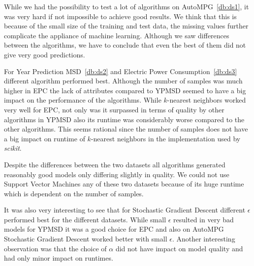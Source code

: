 While we had the possibility to test a lot of algorithms on AutoMPG~\ref{db:ds1}, it was very hard if not impossible to achieve good results. We think that this is because of the small size of the training and test data, the missing values further complicate the appliance of machine learning. Although we saw differences between the algorithms, we have to conclude that even the best of them did not give very good predictions.\par
For Year Prediction MSD~\ref{db:ds2} and Electric Power Consumption~\ref{db:ds3} different algorithm performed best. Although the number of samples was much higher in EPC the lack of attributes compared to YPMSD seemed to have a big impact on the performance of the algorithms. While $k$-nearest neighbors worked very well for EPC, not only was it surpassed in terms of quality by other algorithms in YPMSD also its runtime was considerably worse compared to the other algorithms. This seems rational since the number of samples does not have a big impact on runtime of $k$-nearest neighbors in the implementation used by \textit{scikit}.\par
Despite the differences between the two datasets all algorithms generated reasonably good models only differing slightly in quality. We could not use Support Vector Machines any of these two datasets because of its huge runtime which is dependent on the number of samples.\par

It was also very interesting to see that for Stochastic Gradient Descent different $\epsilon$ performed best for the different datasets. While small $\epsilon$ resulted in very bad models for YPMSD it was a good choice for EPC and also on AutoMPG Stochastic Gradient Descent worked better with small $\epsilon$. Another interesting observation was that the choice of $\alpha$ did not have impact on model quality and had only minor impact on runtimes.
